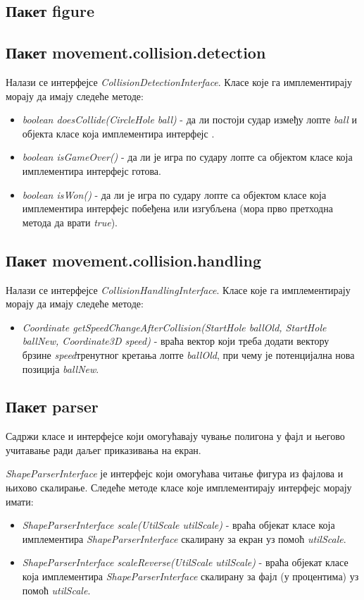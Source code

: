 \subsection{Пакет figure}
\subsection{Пакет movement.collision.detection}
Налази се интерфејсе \emph{CollisionDetectionInterface}. Класе које га имплементирају морају да имају следеће методе:
\begin{itemize}
\item \emph{boolean doesCollide(CircleHole ball)} - да ли постоји судар између лопте \emph{ball} и објекта класе која имплементира интерфејс .
\item \emph{boolean isGameOver()} - да ли је игра по судару лопте са  објектом класе која имплементира интерфејс готова.
\item \emph{boolean isWon()} - да ли је игра по судару лопте са  објектом класе  која имплементира интерфејс побеђена или изгубљена (мора прво претходна метода да врати \emph{true}).
\end{itemize}
\subsection{Пакет movement.collision.handling}
Налази се интерфејсе \emph{CollisionHandlingInterface}. Класе које га имплементирају морају да имају следеће методе:
\begin{itemize}
\item \emph{Coordinate getSpeedChangeAfterCollision(StartHole ballOld, StartHole ballNew, Coordinate3D speed)} - враћа вектор који треба додати вектору брзине \emph{speed}тренутног кретања лопте \emph{ballOld}, при чему је потенцијална нова позиција \emph{ballNew}. 
\end{itemize}

\subsection{Пакет parser}
	
Садржи класе и интерфејсе који омогућавају чување полигона у фајл и његово учитавање ради даљег приказивања на екран.

\emph{ShapeParserInterface} је интерфејс који омогућава читање фигура из фајлова и њихово скалирање. Следеће методе класе које имплементирају интерфејс морају имати:
\begin{itemize}
\item \emph{ShapeParserInterface scale(UtilScale utilScale)} - враћа објекат класе која имплементира \emph{ShapeParserInterface} скалирану за екран уз помоћ \emph{utilScale}.
\item \emph{ShapeParserInterface scaleReverse(UtilScale utilScale)} - враћа објекат класе која имплементира \emph{ShapeParserInterface} скалирану за фајл (у процентима) уз помоћ \emph{utilScale}.
\end{itemize}

